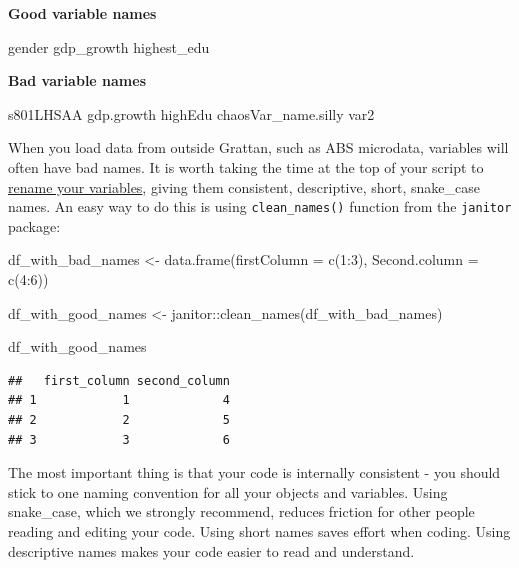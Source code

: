 \documentclass[
]{book}
\newenvironment{Shaded}{\begin{snugshade}}{\end{snugshade}}
\newcommand{\AttributeTok}[1]{\textcolor[rgb]{0.77,0.63,0.00}{#1}}
\newcommand{\DecValTok}[1]{\textcolor[rgb]{0.00,0.00,0.81}{#1}}
\newcommand{\FunctionTok}[1]{\textcolor[rgb]{0.00,0.00,0.00}{#1}}
\newcommand{\NormalTok}[1]{#1}
\newcommand{\OtherTok}[1]{\textcolor[rgb]{0.56,0.35,0.01}{#1}}
\newcommand{\SpecialCharTok}[1]{\textcolor[rgb]{0.00,0.00,0.00}{#1}}
\begin{document}
\textbf{Good variable names}

\begin{Shaded}
\begin{Highlighting}[]
\NormalTok{gender}
\NormalTok{gdp\_growth}
\NormalTok{highest\_edu}
\end{Highlighting}
\end{Shaded}

\textbf{Bad variable names}

\begin{Shaded}
\begin{Highlighting}[]
\NormalTok{s801LHSAA}
\NormalTok{gdp.growth}
\NormalTok{highEdu}
\NormalTok{chaosVar\_name.silly}
\NormalTok{var2}
\end{Highlighting}
\end{Shaded}

When you load data from outside Grattan, such as ABS microdata, variables will often have bad names. It is worth taking the time at the top of your script to \href{https://dplyr.tidyverse.org/reference/select.html}{rename your variables}, giving them consistent, descriptive, short, snake\_case names. An easy way to do this is using \texttt{clean\_names()} function from the \texttt{janitor} package:

\begin{Shaded}
\begin{Highlighting}[]
\NormalTok{df\_with\_bad\_names }\OtherTok{\textless{}{-}} \FunctionTok{data.frame}\NormalTok{(}\AttributeTok{firstColumn =} \FunctionTok{c}\NormalTok{(}\DecValTok{1}\SpecialCharTok{:}\DecValTok{3}\NormalTok{),}
                                \AttributeTok{Second.column =} \FunctionTok{c}\NormalTok{(}\DecValTok{4}\SpecialCharTok{:}\DecValTok{6}\NormalTok{))}

\NormalTok{df\_with\_good\_names }\OtherTok{\textless{}{-}}\NormalTok{ janitor}\SpecialCharTok{::}\FunctionTok{clean\_names}\NormalTok{(df\_with\_bad\_names)}

\NormalTok{df\_with\_good\_names}
\end{Highlighting}
\end{Shaded}

\begin{verbatim}
##   first_column second_column
## 1            1             4
## 2            2             5
## 3            3             6
\end{verbatim}

The most important thing is that your code is internally consistent - you should stick to one naming convention for all your objects and variables. Using snake\_case, which we strongly recommend, reduces friction for other people reading and editing your code. Using short names saves effort when coding. Using descriptive names makes your code easier to read and understand.
\end{document}
